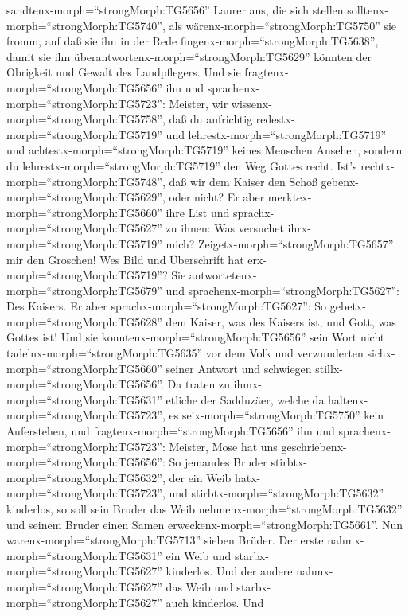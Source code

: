 sandtenx-morph=``strongMorph:TG5656'' Laurer aus, die sich stellen
solltenx-morph=``strongMorph:TG5740'', als
wärenx-morph=``strongMorph:TG5750'' sie fromm, auf daß sie ihn in der
Rede fingenx-morph=``strongMorph:TG5638'', damit sie ihn
überantwortenx-morph=``strongMorph:TG5629'' könnten der Obrigkeit und
Gewalt des Landpflegers.  Und sie
fragtenx-morph=``strongMorph:TG5656'' ihn und
sprachenx-morph=``strongMorph:TG5723'': Meister, wir
wissenx-morph=``strongMorph:TG5758'', daß du aufrichtig
redestx-morph=``strongMorph:TG5719'' und
lehrestx-morph=``strongMorph:TG5719'' und
achtestx-morph=``strongMorph:TG5719'' keines Menschen Ansehen, sondern
du lehrestx-morph=``strongMorph:TG5719'' den Weg Gottes recht.
 Ist's rechtx-morph=``strongMorph:TG5748'', daß wir dem
Kaiser den Schoß gebenx-morph=``strongMorph:TG5629'', oder nicht?
 Er aber merktex-morph=``strongMorph:TG5660'' ihre List und
sprachx-morph=``strongMorph:TG5627'' zu ihnen: Was versuchet
ihrx-morph=``strongMorph:TG5719'' mich? 
Zeigetx-morph=``strongMorph:TG5657'' mir den Groschen! Wes Bild und
Überschrift hat erx-morph=``strongMorph:TG5719''? Sie
antwortetenx-morph=``strongMorph:TG5679'' und
sprachenx-morph=``strongMorph:TG5627'': Des Kaisers.  Er
aber sprachx-morph=``strongMorph:TG5627'': So
gebetx-morph=``strongMorph:TG5628'' dem Kaiser, was des Kaisers ist, und
Gott, was Gottes ist!  Und sie
konntenx-morph=``strongMorph:TG5656'' sein Wort nicht
tadelnx-morph=``strongMorph:TG5635'' vor dem Volk und verwunderten
sichx-morph=``strongMorph:TG5660'' seiner Antwort und schwiegen
stillx-morph=``strongMorph:TG5656''.  Da traten zu
ihmx-morph=``strongMorph:TG5631'' etliche der Sadduzäer, welche da
haltenx-morph=``strongMorph:TG5723'', es
seix-morph=``strongMorph:TG5750'' kein Auferstehen, und
fragtenx-morph=``strongMorph:TG5656'' ihn  und
sprachenx-morph=``strongMorph:TG5723'': Meister, Mose hat uns
geschriebenx-morph=``strongMorph:TG5656'': So jemandes Bruder
stirbtx-morph=``strongMorph:TG5632'', der ein Weib
hatx-morph=``strongMorph:TG5723'', und
stirbtx-morph=``strongMorph:TG5632'' kinderlos, so soll sein Bruder das
Weib nehmenx-morph=``strongMorph:TG5632'' und seinem Bruder einen Samen
erweckenx-morph=``strongMorph:TG5661''.  Nun
warenx-morph=``strongMorph:TG5713'' sieben Brüder. Der erste
nahmx-morph=``strongMorph:TG5631'' ein Weib und
starbx-morph=``strongMorph:TG5627'' kinderlos.  Und der
andere nahmx-morph=``strongMorph:TG5627'' das Weib und
starbx-morph=``strongMorph:TG5627'' auch kinderlos.  Und
